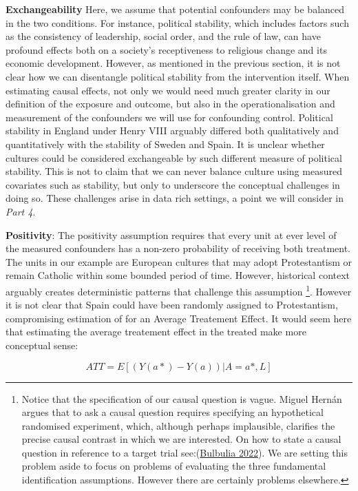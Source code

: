 \documentclass[
  singlecolumn]{report}
\begin{document}
\textbf{Exchangeability} Here, we assume that potential confounders may
be balanced in the two conditions. For instance, political stability,
which includes factors such as the consistency of leadership, social
order, and the rule of law, can have profound effects both on a
society's receptiveness to religious change and its economic
development. However, as mentioned in the previous section, it is not
clear how we can disentangle political stability from the intervention
itself. When estimating causal effects, not only we would need much
greater clarity in our definition of the exposure and outcome, but also
in the operationalisation and measurement of the confounders we will use
for confounding control. Political stability in England under Henry VIII
arguably differed both qualitatively and quantitatively with the
stability of Sweden and Spain. It is unclear whether cultures could be
considered exchangeable by such different measure of political
stability. This is not to claim that we can never balance culture using
measured covariates such as stability, but only to underscore the
conceptual challenges in doing so. These challenges arise in data rich
settings, a point we will consider in \emph{Part 4}.

\textbf{Positivity}: The positivity assumption requires that every unit
at ever level of the measured confounders has a non-zero probability of
receiving both treatment. The units in our example are European cultures
that may adopt Protestantism or remain Catholic within some bounded
period of time. However, historical context arguably creates
deterministic patterns that challenge this assumption \footnote{Notice
  that the specification of our causal question is vague. Miguel Hernán
  argues that to ask a causal question requires specifying an
  hypothetical randomised experiment, which, although perhaps
  implausible, clarifies the precise causal contrast in which we are
  interested. On how to state a causal question in reference to a target
  trial see:(\protect\hyperlink{ref-bulbulia2022}{Bulbulia 2022}). We
  are setting this problem aside to focus on problems of evaluating the
  three fundamental identification assumptions. However there are
  certainly problems elsewhere.}. However it is not clear that Spain
could have been randomly assigned to Protestantism, compromising
estimation of for an Average Treatement Effect. It would seem here that
estimating the average treatement effect in the treated make more
conceptual sense:

\[ATT = E[(Y(a*)- Y(a))|A = a*, L]\]
\end{document}
